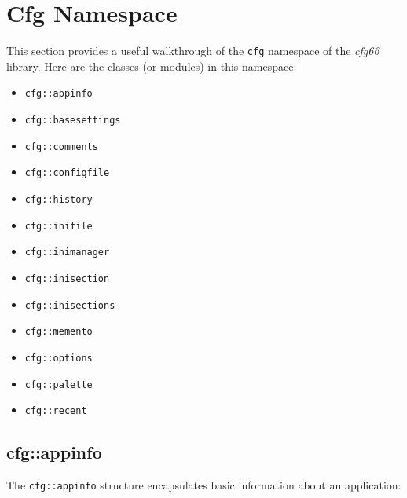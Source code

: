%
%
%

\section{Cfg Namespace}
\label{sec:cfg_namespace}

   This section provides a useful walkthrough of the \texttt{cfg} namespace of
   the \textsl{cfg66} library.
   Here are the classes (or modules) in this namespace:

   \begin{itemize}
      \item \texttt{cfg::appinfo}
      \item \texttt{cfg::basesettings}
      \item \texttt{cfg::comments}
      \item \texttt{cfg::configfile}
      \item \texttt{cfg::history}
      \item \texttt{cfg::inifile}
      \item \texttt{cfg::inimanager}
      \item \texttt{cfg::inisection}
      \item \texttt{cfg::inisections}
      \item \texttt{cfg::memento}
      \item \texttt{cfg::options}
      \item \texttt{cfg::palette}
      \item \texttt{cfg::recent}
   \end{itemize}

\subsection{cfg::appinfo}
\label{subsec:cfg_namespace_appinfo}

   The \texttt{cfg::appinfo} structure encapsulates basic information about
   an application:

